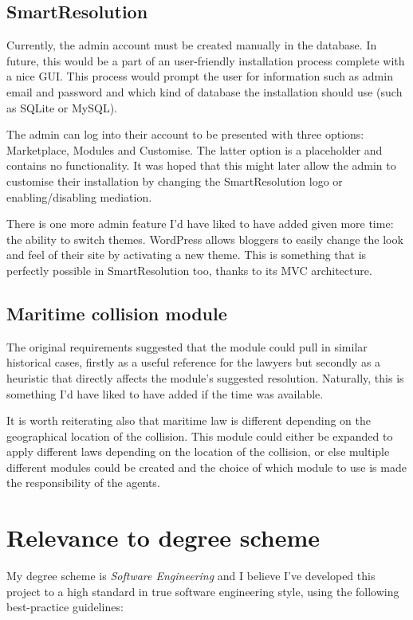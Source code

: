 \subsection{SmartResolution}

Currently, the admin account must be created manually in the database. In future, this would be a part of an user-friendly installation process complete with a nice GUI. This process would prompt the user for information such as admin email and password and which kind of database the installation should use (such as SQLite or MySQL).

The admin can log into their account to be presented with three options: Marketplace, Modules and Customise. The latter option is a placeholder and contains no functionality. It was hoped that this might later allow the admin to customise their installation by changing the SmartResolution logo or enabling/disabling mediation.

There is one more admin feature I'd have liked to have added given more time: the ability to switch themes. WordPress allows bloggers to easily change the look and feel of their site by activating a new theme. This is something that is perfectly possible in SmartResolution too, thanks to its MVC architecture.

\subsection{Maritime collision module}

The original requirements suggested that the module could pull in similar historical cases, firstly as a useful reference for the lawyers but secondly as a heuristic that directly affects the module's suggested resolution. Naturally, this is something I'd have liked to have added if the time was available.

It is worth reiterating also that maritime law is different depending on the geographical location of the collision. This module could either be expanded to apply different laws depending on the location of the collision, or else multiple different modules could be created and the choice of which module to use is made the responsibility of the agents.

\section{Relevance to degree scheme}

My degree scheme is \emph{Software Engineering} and I believe I've developed this project to a high standard in true software engineering style, using the following best-practice guidelines:

